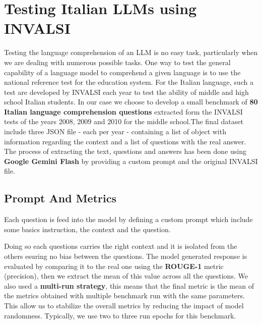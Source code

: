\documentclass{article}
\begin{document}
		
	\section{Testing Italian LLMs using INVALSI}
	Testing the language comprehension of an LLM is no easy task, particularly when we are dealing with numerous possible tasks. One way to test the general capability of a language model to comprehend a given language is to use the national reference test for the education system. For the Italian language, such a test are developed by INVALSI each year to test the ability of middle and high school Italian students. 
	In our case we choose to develop a small benchmark of \textbf{80 Italian language comprehension questions} extracted form the INVALSI tests of the years 2008, 2009 and 2010 for the middle school.The final dataset include three JSON file - each per year - containing a list of object with information regarding the context and a list of questions with the real answer.
	The process of extracting the text, questions and answers has been done using \textbf{Google Gemini Flash} by providing a custom prompt and the original INVALSI file.  

	\subsection{Prompt And Metrics}
	Each question is feed into the model by defining a custom prompt which include some basics instruction, the context and the question.
	\begin{center}
	\end{center}
	Doing so each questions carries the right context and it is isolated from the others esuring no bias between the questions.
	The model generated response is evaluated by comparing it to the real one using the \textbf{ROUGE-1} metric (precision), then we extract the mean of this value across all the questions.
	We also used a \textbf{multi-run strategy}, this means that the final metric is the mean of the metrics obtained with multiple benchmark run with the same parameters. This allow us to stabilize the overall metrics by reducing the impact of model randomness. Typically, we use two to three run epochs for this benchmark. 
	
\end{document}
